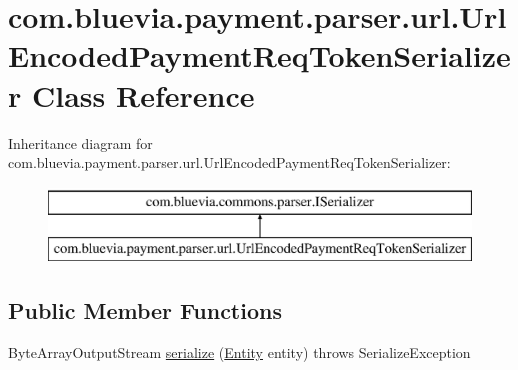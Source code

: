 \hypertarget{classcom_1_1bluevia_1_1payment_1_1parser_1_1url_1_1UrlEncodedPaymentReqTokenSerializer}{
\section{com.bluevia.payment.parser.url.UrlEncodedPaymentReqTokenSerializer Class Reference}
\label{classcom_1_1bluevia_1_1payment_1_1parser_1_1url_1_1UrlEncodedPaymentReqTokenSerializer}
}
Inheritance diagram for com.bluevia.payment.parser.url.UrlEncodedPaymentReqTokenSerializer:\begin{figure}[H]
\begin{center}
\leavevmode
\includegraphics[height=2.000000cm]{classcom_1_1bluevia_1_1payment_1_1parser_1_1url_1_1UrlEncodedPaymentReqTokenSerializer}
\end{center}
\end{figure}
\subsection*{Public Member Functions}
\begin{DoxyCompactItemize}
\item 
ByteArrayOutputStream \hyperlink{classcom_1_1bluevia_1_1payment_1_1parser_1_1url_1_1UrlEncodedPaymentReqTokenSerializer_a38390faff29944a93d8c852c0753778b}{serialize} (\hyperlink{interfacecom_1_1bluevia_1_1commons_1_1Entity}{Entity} entity)  throws SerializeException 
\end{DoxyCompactItemize}


